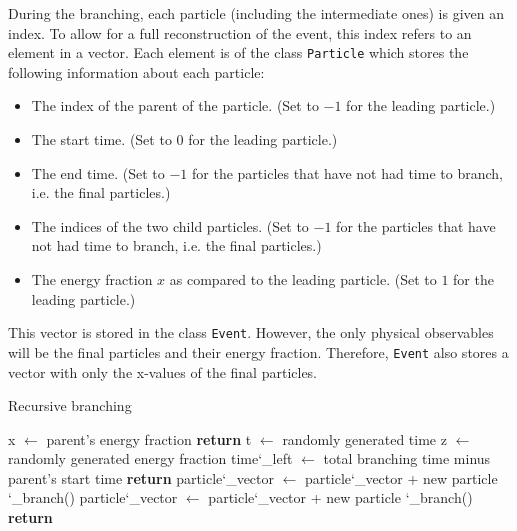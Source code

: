 \documentclass[a4paper,12pt]{article}
\numberwithin{equation}{section}
\begin{document}


During the branching, each particle (including the intermediate ones) is given an index. To allow for a full reconstruction of the event, this index refers to an element in a vector. Each element is of the class {\tt Particle} which stores the following information about each particle:
\begin{itemize}
\item The index of the parent of the particle. (Set to $-1$ for the leading particle.)
\item The start time. (Set to $0$ for the leading particle.)
\item The end time. (Set to $-1$ for the particles that have not had time to branch, i.e. the final particles.)
\item The indices of the two child particles. (Set to $-1$ for the particles that have not had time to branch, i.e. the final particles.)
\item The energy fraction $x$ as compared to the leading particle. (Set to $1$ for the leading particle.)
\end{itemize}
This vector is stored in the class {\tt Event}. However, the only physical observables will be the final particles and their energy fraction. Therefore, {\tt Event} also stores a vector with only the x-values of the final particles. 


\begin{algorithm}
\caption{Recursive branching}\label{branchingAlg}
\begin{tt}
\begin{algorithmic}[0]
\State x $\gets$ parent's energy fraction
 
\State \textbf{return}
\EndIf
\State t $\gets$ randomly generated time
\State z $\gets$ randomly generated energy fraction
\State time\char`_left $\gets$ total branching time minus parent's start time
 
\State \textbf{return}
\EndIf
\State particle\char`_vector $\gets$ particle\char`_vector + new particle
\State \char`_branch()
\State particle\char`_vector $\gets$ particle\char`_vector + new particle
\State \char`_branch()
\State \textbf{return}
\EndFunction
\end{algorithmic}
\end{tt}
\end{algorithm}
\end{document}
